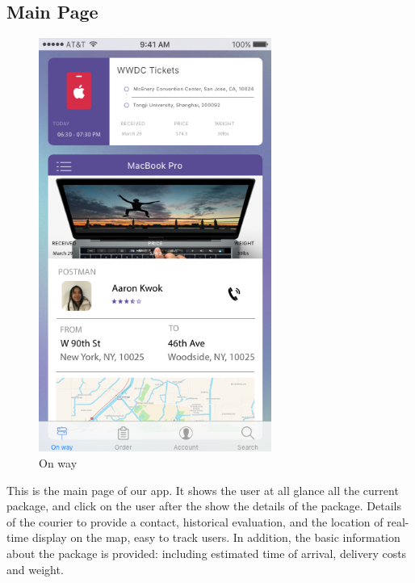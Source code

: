 \documentclass[12pt]{scrreprt}
\begin{document}
\subsection{Main Page}
\begin{figure}[htbp]
  \centering\includegraphics[width=3in]{DocumentRes/OnWay.png}
  \caption{On way}
\end{figure}
This is the main page of our app. It shows the user at all glance all the
current package, and click on the user after the show the details of the
package. Details of the courier to provide a contact, historical evaluation,
and the location of real-time display on the map, easy to track users.
In addition, the basic information about the package is provided:
including estimated time of arrival, delivery costs and weight.
\end{document}
